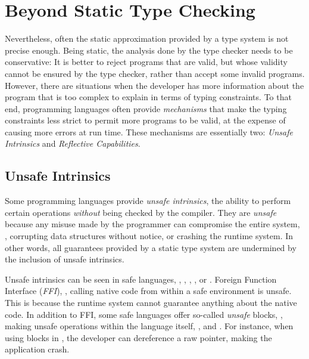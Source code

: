 

\section{Beyond Static Type Checking}

Nevertheless, often the static approximation provided by a type system is not precise enough.
Being static, the analysis done by the type checker needs to be conservative:
It is better to reject programs that are valid,
but whose validity cannot be ensured by the type checker,
rather than accept some invalid programs.
However, there are situations when the developer has more information
about the program that is too complex to explain in terms of typing constraints.
To that end, programming languages often provide \emph{mechanisms} that 
make the typing constraints less strict
to permit more programs to be valid,
at the expense of causing more errors at run time.
These mechanisms are essentially two:
\emph{Unsafe Intrinsics} and \emph{Reflective Capabilities}.

\subsection*{Unsafe Intrinsics}

Some programming languages provide \emph{unsafe intrinsics},
the ability to perform certain operations \emph{without} being checked by the compiler.
They are \emph{unsafe} because any misuse made by the programmer can compromise the entire system, \eg{},
corrupting data structures without notice, or
crashing the runtime system.
In other words,
all guarantees provided by a static type system are undermined by the inclusion of unsafe intrinsics.

Unsafe intrinsics can be seen in safe languages, \eg{},
\java{}, \csharp{}, \rust{}, or \haskell{}.
Foreign Function Interface (\emph{FFI}), \ie{}, calling native code from within a safe environment is unsafe.
This is because the runtime system cannot guarantee anything about the native code.
In addition to FFI,
some safe languages offer so-called \emph{unsafe} blocks, \ie{},
making unsafe operations within the language itself, \eg{},
\csharp{}%
and
\rust{}.%
For instance,
when using  blocks in \rust{},
the developer can dereference a raw pointer,
making the application crash.

